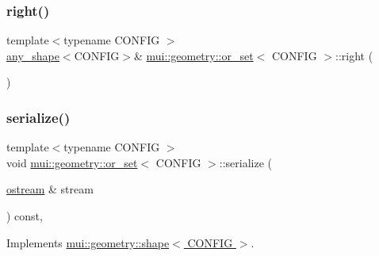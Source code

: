 \subsubsection{\texorpdfstring{right()}{right()}\hspace{0.1cm}{\footnotesize\ttfamily [2/2]}}
{\footnotesize\ttfamily template$<$typename C\+O\+N\+F\+IG $>$ \\
\hyperlink{classmui_1_1geometry_1_1any__shape}{any\+\_\+shape}$<$C\+O\+N\+F\+IG$>$\& \hyperlink{classmui_1_1geometry_1_1or__set}{mui\+::geometry\+::or\+\_\+set}$<$ C\+O\+N\+F\+IG $>$\+::right (\begin{DoxyParamCaption}{ }\end{DoxyParamCaption})\hspace{0.3cm}{\ttfamily [inline]}}

\mbox{\label{classmui_1_1geometry_1_1or__set_ae761a2812fb9749e7df978a50b72cd76}} 
\subsubsection{\texorpdfstring{serialize()}{serialize()}}
{\footnotesize\ttfamily template$<$typename C\+O\+N\+F\+IG $>$ \\
void \hyperlink{classmui_1_1geometry_1_1or__set}{mui\+::geometry\+::or\+\_\+set}$<$ C\+O\+N\+F\+IG $>$\+::serialize (\begin{DoxyParamCaption}\item[{\hyperlink{classmui_1_1ostream}{ostream} \&}]{stream }\end{DoxyParamCaption}) const\hspace{0.3cm}{\ttfamily [inline]}, {\ttfamily [virtual]}}



Implements \hyperlink{classmui_1_1geometry_1_1shape_ab1b2e763113b96dd0ae3deedfa0e7d22}{mui\+::geometry\+::shape$<$ C\+O\+N\+F\+I\+G $>$}.

\mbox{\label{classmui_1_1geometry_1_1or__set_a1cb6c72bb7be1fca6ccd038cf6d6946e}} 
